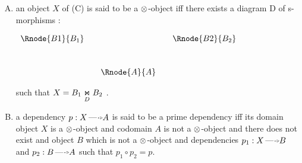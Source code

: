 \documentclass[10pt,a4paper]{scrartcl}
\begin{document}
\begin{enumerate} [A.,leftmargin=0.5cm]
\begin{enumerate}[label*=\arabic*]
is a pullback in category 

\item \label{mediatingtwo} such that for any 
object $C$ and for cones $f_1:C \morph B_1$ and $f_2:C \morph B_2$ to diagram $D$,
the mediating morphism $h: N \morph B_1 \underset{D}{\Join} B_2$ is a d-moprphism iff 
each of $f_1$ and $f_2$  is a d-morphism and and the characteristic diagram of
\begin{center}
$
\setlength{\arraycolsep}{.25cm}
\begin{array}{ccc}
             & \Rnode{C}{C}&               \\ [0.6cm]
\Rnode{B1}{B_1}&             & \Rnode{B2}{B_2} \\ 
\end{array}
$
\end{center}
is
\begin{center}
$
\setlength{\arraycolsep}{.25cm}
\begin{array}{ccc}
\Rnode{B1}{B_1}&            & \Rnode{B2}{B_2} \\ [0.6cm]
             &\Rnode{A}{A}& 
\end{array}
$
\end{center}

\item \label{coherenceone}
Coherence of the above pullbacks -- so pullbacks of composite d-morphisms are notational convenience for repeated
pullbacks of component s-morphisms.

\item \label{hypothesis} Laxima \ref{mediatingtwo} follows from from earlier \ref{mediatingone} and from \ref{coherenceone}.

\end{enumerate} %

\item
an object $X$ of \cat(C) is said to be a $\cross$-object iff there exists 
a diagram D of s-morphisms :
	\begin{center}
$
\begin{array}{cp{0cm}cp{0cm}c}
\Rnode{B1}{B_1}& &            &  &\Rnode{B2}{B_2} \\ [1.0cm]
               & &\Rnode{A}{A}& &
\end{array}
$
\end{center}

such that $X=\fibrex{B_1}{B_2}{D}$ .
\item
a dependency $p:X \dmorph A$ is said to be a prime dependency iff its domain object $X$ is a $\cross$-object and 
codomain $A$ is not a $\cross$-object and there does not exist and object $B$ which is not a $\cross$-object and dependencies $p_1:X \dmorph B$ and $p_2: B \dmorph A$ such that $p_1 \circ p_2 = p$. 


\end{enumerate}
\end{document}
